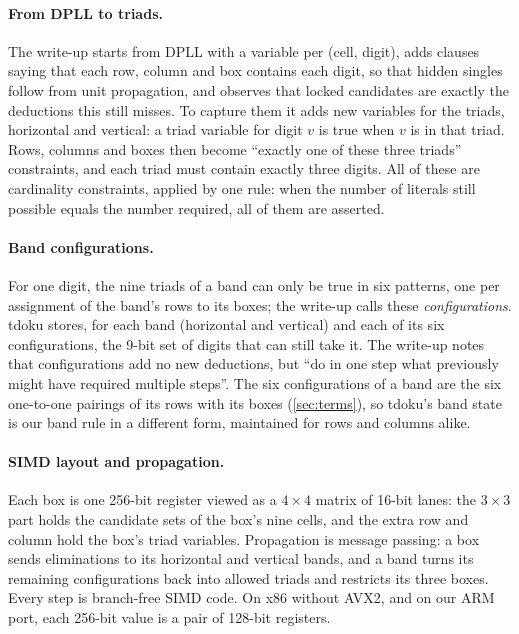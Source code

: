 \documentclass[11pt]{article}
\theoremstyle{definition}
\theoremstyle{plain}
\begin{document}
\paragraph{From DPLL to triads.} The write-up starts from DPLL with a variable per (cell, digit), adds clauses saying
that each row, column and box contains each digit, so that hidden singles follow from unit propagation, and observes
that locked candidates are exactly the deductions this still misses. To capture them it adds new variables for the
triads, horizontal and vertical: a triad variable for digit $v$ is true when $v$ is in that triad. Rows,
columns and boxes then become ``exactly one of these three triads'' constraints, and each triad must contain exactly
three digits. All of these are cardinality constraints, applied by one rule: when the number of literals still possible
equals the number required, all of them are asserted.

\paragraph{Band configurations.} For one digit, the nine triads of a band can only be true in six patterns, one per
assignment of the band's rows to its boxes; the write-up calls these \emph{configurations}. tdoku stores, for each band
(horizontal and vertical) and each of its six configurations, the 9-bit set of digits that can still take it. The
write-up notes that configurations add no new deductions, but ``do in one step what previously might have required
multiple steps''. The six configurations of a band are the six one-to-one pairings of its rows with its boxes (\cref{sec:terms}), so tdoku's band
state is our band rule in a different form, maintained for rows and columns alike.

\paragraph{SIMD layout and propagation.} Each box is one 256-bit register viewed as a $4\times 4$ matrix of 16-bit
lanes: the $3\times 3$ part holds the candidate sets of the box's nine cells, and the extra row and column hold the box's triad variables. Propagation is message passing: a box sends eliminations to its horizontal and vertical bands, and a band
turns its remaining configurations back into allowed triads and restricts its three boxes. Every step is branch-free
SIMD code. On x86 without AVX2, and on our ARM port, each 256-bit value is a pair of 128-bit registers.
\end{document}
